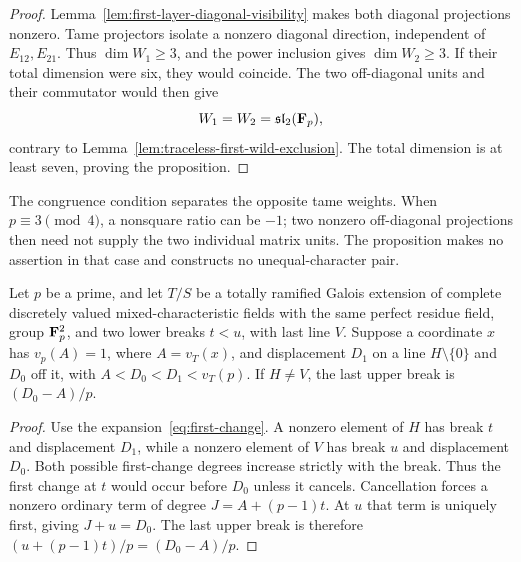 \begin{proof}
Lemma~\ref{lem:first-layer-diagonal-visibility} makes both diagonal projections nonzero. Tame projectors isolate a nonzero diagonal direction, independent of $E_{12},E_{21}$. Thus $\dim W_1\ge3$, and the power inclusion gives $\dim W_2\ge3$. If their total dimension were six, they would coincide. The two off-diagonal units and their commutator would then give
\[
                    W_1=W_2=\mathfrak{sl}_2(\mathbf F_p),
\]
contrary to Lemma~\ref{lem:traceless-first-wild-exclusion}. The total dimension is at least seven, proving the proposition.
\end{proof}

The congruence condition separates the opposite tame weights. When $p\equiv3\pmod4$, a nonsquare ratio can be $-1$; two nonzero off-diagonal projections then need not supply the two individual matrix units. The proposition makes no assertion in that case and constructs no unequal-character pair.

\begin{lemma}\label{lem:opposite-line-conductor}
Let $p$ be a prime, and let $T/S$ be a totally ramified Galois extension of complete discretely valued mixed-characteristic fields with the same perfect residue field, group $\mathbf F_p^2$, and two lower breaks $t<u$, with last line $V$. Suppose a coordinate $x$ has $v_p(A)=1$, where $A=v_T(x)$, and displacement $D_1$ on a line $H\setminus\{0\}$ and $D_0$ off it, with $A<D_0<D_1<v_T(p)$. If $H\ne V$, the last upper break is $(D_0-A)/p$.
\end{lemma}
\begin{proof}
Use the expansion~\eqref{eq:first-change}. A nonzero element of $H$ has break $t$ and displacement $D_1$, while a nonzero element of $V$ has break $u$ and displacement $D_0$. Both possible first-change degrees increase strictly with the break. Thus the first change at $t$ would occur before $D_0$ unless it cancels. Cancellation forces a nonzero ordinary term of degree $J=A+(p-1)t$. At $u$ that term is uniquely first, giving $J+u=D_0$. The last upper break is therefore $(u+(p-1)t)/p=(D_0-A)/p$.
\end{proof}

